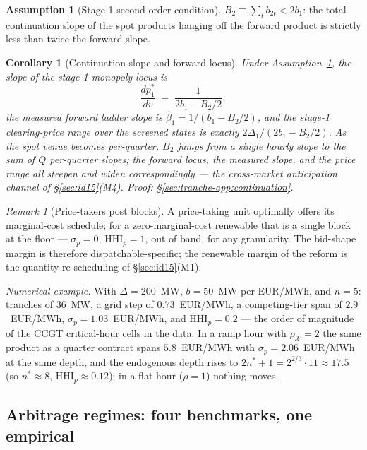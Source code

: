 \documentclass[11pt,a4paper]{article}
\newtheorem{corollary}{Corollary}
\theoremstyle{definition}
\newtheorem{assumption}{Assumption}
\theoremstyle{remark}
\newtheorem{remark}{Remark}
\theoremstyle{plain}
\begin{document}
\begin{assumption}[Stage-1 second-order condition]\label{ass:soc}
$B_2 \equiv \sum_t b_{2t} < 2 b_1$: the total continuation slope of the spot products hanging off the forward product is strictly less than twice the forward slope.
\end{assumption}

\begin{corollary}[Continuation slope and forward locus]\label{cor:continuation}
Under Assumption~\ref{ass:soc}, the slope of the stage-1 monopoly locus is
\[
\frac{d p_1^*}{d v} \;=\; \frac{1}{2 b_1 - B_2/2},
\]
the measured forward ladder slope is $\hat\beta_1 = 1/(b_1 - B_2/2)$, and the stage-1 clearing-price range over the screened states is exactly $2\Delta_1/(2 b_1 - B_2/2)$. As the spot venue becomes per-quarter, $B_2$ jumps from a single hourly slope to the sum of $Q$ per-quarter slopes; the forward locus, the measured slope, and the price range all steepen and widen correspondingly --- the cross-market anticipation channel of \S\ref{sec:id15}(M4). \emph{Proof: \S\ref{sec:tranche-app:continuation}.}
\end{corollary}

\begin{remark}[Price-takers post blocks]\label{rem:pricetaker}
A price-taking unit optimally offers its marginal-cost schedule; for a zero-marginal-cost renewable that is a single block at the floor --- $\sigma_p = 0$, $\text{HHI}_p = 1$, out of band, for any granularity. The bid-shape margin is therefore dispatchable-specific; the renewable margin of the reform is the quantity re-scheduling of \S\ref{sec:id15}(M1).
\end{remark}

\emph{Numerical example.} With $\Delta = 200$~MW, $b = 50$~MW per EUR/MWh, and $n = 5$: tranches of $36$~MW, a grid step of $0.73$~EUR/MWh, a competing-tier span of $2.9$~EUR/MWh, $\sigma_p = 1.03$~EUR/MWh, and $\text{HHI}_p = 0.2$ --- the order of magnitude of the CCGT critical-hour cells in the data. In a ramp hour with $\rho_{\mathcal X} = 2$ the same product as a quarter contract spans $5.8$~EUR/MWh with $\sigma_p = 2.06$~EUR/MWh at the same depth, and the endogenous depth rises to $2n^*+1 = 2^{2/3}\cdot 11 \approx 17.5$ (so $n^* \approx 8$, $\text{HHI}_p \approx 0.12$); in a flat hour ($\rho = 1$) nothing moves.

\subsection{Arbitrage regimes: four benchmarks, one empirical}\label{sec:arbitrage}
\end{document}
